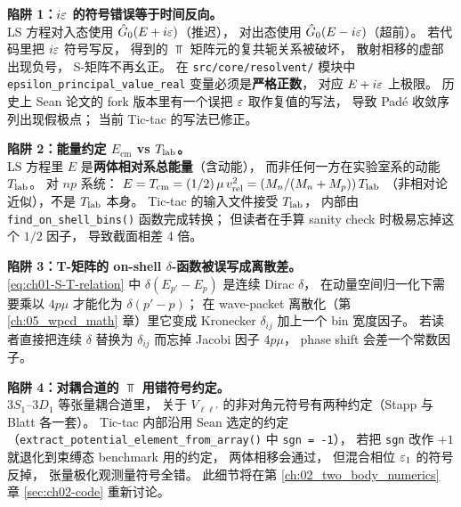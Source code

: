 \begin{pitfallbox}
\textbf{陷阱 1：$i\varepsilon$ 的符号错误等于时间反向。}\\
LS 方程对入态使用 $\hat{G}_0(E + i\varepsilon)$（推迟），
对出态使用 $\hat{G}_0(E - i\varepsilon)$（超前）。
若代码里把 $i\varepsilon$ 符号写反，
得到的 $\Top$ 矩阵元的复共轭关系被破坏，
散射相移的虚部出现负号，
S-矩阵不再幺正。
在 \texttt{src/core/resolvent/} 模块中 \texttt{epsilon\_principal\_value\_real}
变量必须是\textbf{严格正数}，
对应 $E + i\varepsilon$ 上极限。
历史上 Sean 论文的 fork 版本里有一个误把 $\varepsilon$ 取作复值的写法，
导致 Padé 收敛序列出现假极点；
当前 Tic-tac 的写法已修正。
\end{pitfallbox}

\begin{pitfallbox}
\textbf{陷阱 2：能量约定 $E_{\text{cm}}$ vs ${T_{\text{lab}}}$。}\\
LS 方程里 $E$ 是\textbf{两体相对系总能量}（含动能），
而非任何一方在实验室系的动能 ${T_{\text{lab}}}$。
对 $np$ 系统：
$E = T_{\text{cm}} = (1/2)\,\mu\, v_{\text{rel}}^2 = (M_n / (M_n + M_p))\, {T_{\text{lab}}}$
（非相对论近似），不是 ${T_{\text{lab}}}$ 本身。
Tic-tac 的输入文件接受 ${T_{\text{lab}}}$，
内部由 \texttt{find\_on\_shell\_bins()} 函数完成转换；
但读者在手算 sanity check 时极易忘掉这个 $1/2$ 因子，
导致截面相差 4 倍。
\end{pitfallbox}

\begin{pitfallbox}
\textbf{陷阱 3：T-矩阵的 on-shell $\delta$-函数被误写成离散差。}\\
\cref{eq:ch01-S-T-relation} 中 $\delta(E_{p'} - E_p)$ 是连续 Dirac $\delta$，
在动量空间归一化下需要乘以 $4 p \mu$ 才能化为 $\delta(p' - p)$；
在 wave-packet 离散化（第 \ref{ch:05_wpcd_math} 章）里它变成 Kronecker $\delta_{ij}$ 加上一个 bin 宽度因子。
若读者直接把连续 $\delta$ 替换为 $\delta_{ij}$ 而忘掉 Jacobi 因子 $4p\mu$，
phase shift 会差一个常数因子。
\end{pitfallbox}

\begin{pitfallbox}
\textbf{陷阱 4：对耦合道的 $\Top$ 用错符号约定。}\\
$3S_1$--$3D_1$ 等张量耦合道里，
关于 $V_{\ell\ell'}$ 的非对角元符号有两种约定（Stapp 与 Blatt 各一套）。
Tic-tac 内部沿用 Sean 选定的约定（\texttt{extract\_potential\_element\_from\_array()} 中 \texttt{sgn = -1}），
若把 \texttt{sgn} 改作 $+1$ 就退化到束缚态 benchmark 用的约定，
两体相移会通过，
但混合相位 $\varepsilon_1$ 的符号反掉，
张量极化观测量符号全错。
此细节将在第 \ref{ch:02_two_body_numerics} 章 \cref{sec:ch02-code} 重新讨论。
\end{pitfallbox}
